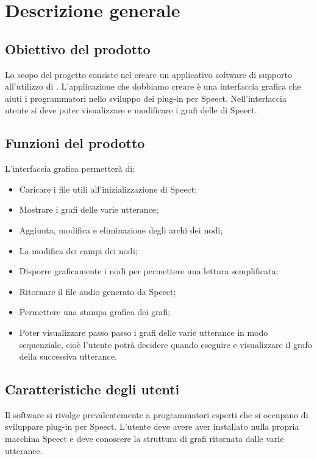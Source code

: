 \documentclass[../AnalisideiRequisiti.tex]{subfiles}
\begin{document}
	
\chapter{Descrizione generale}

\section{Obiettivo del prodotto}

Lo scopo del progetto consiste nel creare un applicativo software di supporto all’utilizzo di . L’applicazione che dobbiamo creare è una interfaccia grafica che aiuti i programmatori nello sviluppo dei plug-in per Speect. Nell’interfaccia utente si deve poter visualizzare e modificare i grafi delle  di Speect. 


\section{Funzioni del prodotto}
L’interfaccia grafica permetterà di:
\begin{itemize}
	\item{} Caricare i file  utili all’inizializzazione di Speect;
	\item{} Mostrare i grafi delle varie utterance;
	\item{} Aggiunta, modifica e eliminazione degli archi dei nodi; 
	\item{} La modifica dei campi dei nodi;
	\item{} Disporre graficamente i nodi per permettere una lettura semplificata;
	\item{} Ritornare il file audio generato da Speect;
	\item{} Permettere una stampa grafica dei grafi;
	\item{} Poter visualizzare passo passo i grafi delle varie utterance in modo sequenziale, cioè l’utente potrà decidere quando eseguire e visualizzare il grafo della successiva utterance.	
\end{itemize}


\section{Caratteristiche degli utenti}
Il software si rivolge prevalentemente a programmatori esperti che si occupano di sviluppare plug-in per Speect. L’utente deve avere aver installato nulla propria macchina Speect e deve conoscere la struttura di grafi ritornata dalle varie utterance.
\end{document}
